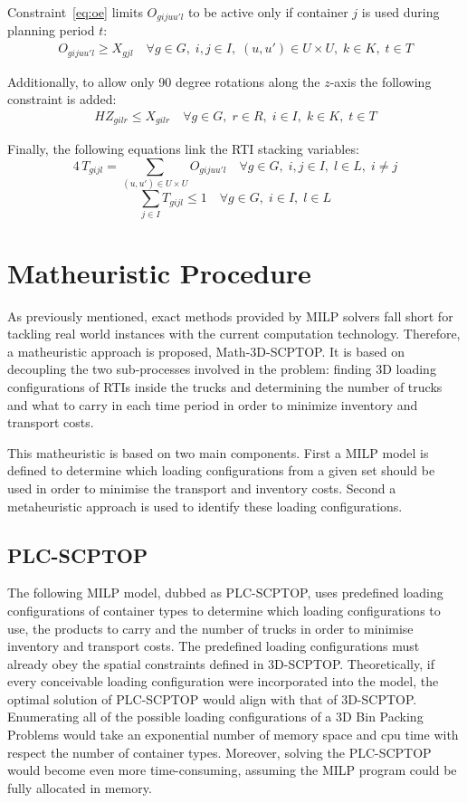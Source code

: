 Constraint~\eqref{eq:oe} limits \(O_{gijuu'l}\) to be active only if container \(j\) is used during planning period \(t\):
\begin{align}
  O_{gijuu'l} \geq X_{gjl} \quad \forall g \in G,\; i,j\in I,\; (u,u')\in U\times U,\; k\in K,\; t\in T \label{eq:oe}
\end{align}

Additionally, to allow only 90 degree rotations along the \(z\)-axis the following constraint is added:
\begin{align}
  HZ_{gilr}\leq X_{gilr} \quad \forall g\in G,\; r\in R,\; i\in I,\; k\in K,\; t \in T
\end{align}

Finally, the following equations link the RTI stacking variables:
\[
  4\,T_{gijl} = \sum_{(u, u') \in U \times U} O_{gijuu'l} \quad \forall g\in G,\; i,j \in I,\; l \in L,\; i\neq j
\]
\[
  \sum_{j \in I} T_{gijl} \leq 1 \quad \forall g \in G,\; i \in I,\; l \in L
\]



\section{Matheuristic Procedure}
\color{black}
As previously mentioned, exact methods provided by MILP solvers fall short for tackling real world instances with the current computation technology.
Therefore, a matheuristic approach is proposed, Math-3D-SCPTOP. It is based on decoupling the two sub-processes involved in the problem: finding 3D loading configurations of RTIs inside the trucks and determining the number of trucks and what to carry in each time period in order to minimize inventory and transport costs.



This matheuristic is based on two main components.
First a MILP model is defined to determine which loading configurations from a given set should be used in order to minimise the transport and inventory costs. Second a metaheuristic approach is used to identify these loading configurations.

\subsection{PLC-SCPTOP}
The following MILP model, dubbed as PLC-SCPTOP, uses predefined loading configurations of container types to determine which loading configurations to use, the products to carry and the number of trucks in order to minimise inventory and transport costs.
The predefined loading configurations must already obey the spatial constraints defined in 3D-SCPTOP.
Theoretically, if every conceivable loading configuration were incorporated into the model, the optimal solution of PLC-SCPTOP would align with that of 3D-SCPTOP.
Enumerating all of the possible loading configurations of a 3D Bin Packing Problems would take an exponential number of memory space and cpu time with respect the number of container types.
Moreover, solving the PLC-SCPTOP would become even more time-consuming, assuming the MILP program could be fully allocated in memory.

